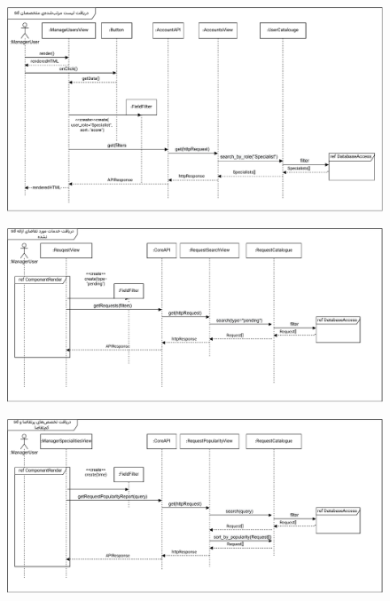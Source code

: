 \begin{figure}[ht!]
	\centering
	\includegraphics[scale=0.8]{figs/design-sequence/3-34.pdf}
\end{figure}

\FloatBarrier
\newpage

\eject \pdfpagewidth=10in \pdfpageheight=9in

\begin{figure}[ht!]
	\centering
	\includegraphics[scale=0.8]{figs/design-sequence/3-35.pdf}
\end{figure}

\FloatBarrier
\newpage

\eject \pdfpagewidth=10in \pdfpageheight=9in

\begin{figure}[ht!]
	\centering
	\includegraphics[scale=0.8]{figs/design-sequence/3-36.pdf}
\end{figure}

